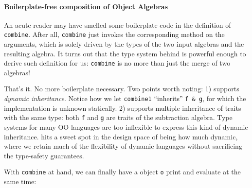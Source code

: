 \begin{comment}
The combinator is defined by the \lstinline{combine} trait, which takes two
algebras to create a combined algebra. It does so by appropriately delegating
behaviours in each component algebra to the combined algebra.


\bruno{Well, the previous subsection already introduces parametric
  polymorphism, so this discussion comes too late!}
Something new appears the above trait declaration. \name supports parametric
polymorphism. In \name, type variables use uppercase letters. Following the work
of~\citet{alpuimdisjoint}, \name uses an extension to universal quantification
called \textit{disjoint quantification}, where a type variable can be
constrained so that it is disjoint with a given type (\lstinline{B * A} for
example). Parametric polymorphism is need because \lstinline{combine} must
compose algebras with arbitrary type parameters. A disjointness constraint is
needed to ensure that two input algebras build values of disjoint types
(otherwise ambiguity could arise).
\end{comment}

\paragraph{Boilerplate-free composition of Object Algebras} 
An acute reader may have smelled some boilerplate code in the definition of
\lstinline{combine}. After all, \lstinline{combine} just invokes the
corresponding method on the arguments, which is solely driven by the types of
the two input algebras and the resulting algebra. It turns out that the type
system behind \name is powerful enough to derive such definition for us:
\lstinline{combine} is no more than just the merge of two algebras!


That's it. No more boilerplate necessary. Two points worth noting: 1) \name
supports \textit{dynamic inheritance}. Notice how we let \lstinline{combine1}
``inherits'' \lstinline{f & g}, for which the implementation is unknown
statically. 2) \name supports multiple inheritance of traits with the same type:
both \lstinline{f} and \lstinline{g} are traits of the subtraction algebra. Type
systems for many OO languages are too inflexible to express this kind of dynamic
inheritance. \name hits a sweet spot in the design space of being how much
dynamic, where we retain much of the flexibility of dynamic languages without
sacrificing the type-safety guarantees.

With \lstinline{combine} at hand, we can finally have a object \lstinline{o}
print and evaluate at the same time:

